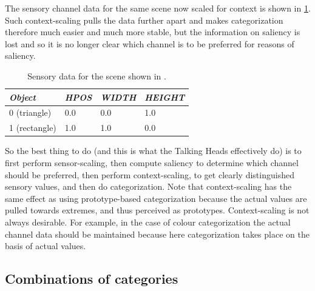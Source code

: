 The sensory channel data for the 
same scene now scaled for context is shown in \ref{tab:t-game22scaled}. Such context-scaling 
pulls the data further apart and makes categorization 
therefore much easier and much more 
stable, but the information on saliency is lost and so 
it is no longer clear which channel is to be preferred
for reasons of saliency. 
\begin{table}
\begin{center}
\begin{tabular}{| l | l | l | l |} \hline
{\it Object} & {\it HPOS} & {\it WIDTH} & {\it HEIGHT} \\ \hline
0 (triangle) & 0.0 & 0.0 & 1.0  \\ \hline
1 (rectangle) & 1.0 & 1.0 & 0.0 \\ \hline 
\end{tabular}
\caption{\label{tab:t-game22scaled} Sensory data for the scene shown in .}
\end{center}
\end{table}
So the best thing to do (and this is what the Talking Heads 
effectively do) is to first perform sensor-scaling, then 
compute saliency to determine which channel should be 
preferred, then perform context-scaling, to get clearly 
distinguished sensory values, and then do categorization. 
Note that context-scaling has the same effect as using 
prototype-based categorization because the actual values 
are pulled towards extremes, and thus perceived as 
prototypes. Context-scaling is not always desirable. For example, 
in the case of colour categorization the actual channel
data should be maintained because here categorization 
takes place on the basis of actual values. 

\subsection{Combinations of categories}

